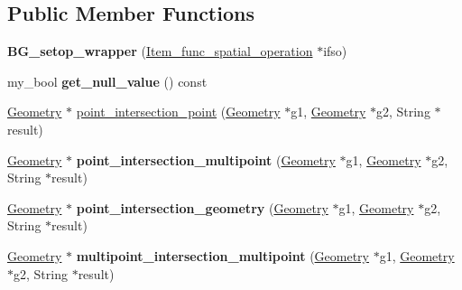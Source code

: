 \subsection*{Public Member Functions}
\begin{DoxyCompactItemize}
\item 
\mbox{\label{classBG__setop__wrapper_a105495c28788add5559d105ddcc28303}} 
{\bfseries B\+G\+\_\+setop\+\_\+wrapper} (\mbox{\hyperlink{classItem__func__spatial__operation}{Item\+\_\+func\+\_\+spatial\+\_\+operation}} $\ast$ifso)
\item 
\mbox{\label{classBG__setop__wrapper_a0425cb0d2ff7a22429bcb0b6172e0e96}} 
my\+\_\+bool {\bfseries get\+\_\+null\+\_\+value} () const
\item 
\mbox{\hyperlink{classGeometry}{Geometry}} $\ast$ \mbox{\hyperlink{classBG__setop__wrapper_ab91ee4979e98a7de15ab19be6dd9f29e}{point\+\_\+intersection\+\_\+point}} (\mbox{\hyperlink{classGeometry}{Geometry}} $\ast$g1, \mbox{\hyperlink{classGeometry}{Geometry}} $\ast$g2, String $\ast$result)
\item 
\mbox{\label{classBG__setop__wrapper_ae15ae8de55b69d3cb3bd551d68e13e1a}} 
\mbox{\hyperlink{classGeometry}{Geometry}} $\ast$ {\bfseries point\+\_\+intersection\+\_\+multipoint} (\mbox{\hyperlink{classGeometry}{Geometry}} $\ast$g1, \mbox{\hyperlink{classGeometry}{Geometry}} $\ast$g2, String $\ast$result)
\item 
\mbox{\label{classBG__setop__wrapper_a8af825fab5aef64dd0c76b17612792f5}} 
\mbox{\hyperlink{classGeometry}{Geometry}} $\ast$ {\bfseries point\+\_\+intersection\+\_\+geometry} (\mbox{\hyperlink{classGeometry}{Geometry}} $\ast$g1, \mbox{\hyperlink{classGeometry}{Geometry}} $\ast$g2, String $\ast$result)
\item 
\mbox{\label{classBG__setop__wrapper_aaa404469716b9274dd6bab49117c4515}} 
\mbox{\hyperlink{classGeometry}{Geometry}} $\ast$ {\bfseries multipoint\+\_\+intersection\+\_\+multipoint} (\mbox{\hyperlink{classGeometry}{Geometry}} $\ast$g1, \mbox{\hyperlink{classGeometry}{Geometry}} $\ast$g2, String $\ast$result)
\item 
\mbox{\label{classBG__setop__wrapper_ae2ba5be2d7f351d1318b5b1a0019a755}} 

\end{DoxyCompactItemize}
